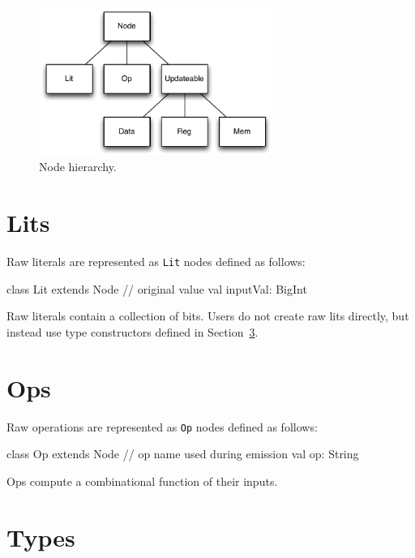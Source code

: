\documentclass[10pt,twocolumn]{article}
\def\code#1{{\small\tt #1}}
\begin{document}
\begin{figure}[h]
\centering
\includegraphics[width=3in]{figs/node-hierarchy.pdf}
\caption{Node hierarchy.}
\label{fig:node-hierarchy}
\end{figure}

\section{Lits}

Raw literals are represented as \code{Lit} nodes defined as follows:

\begin{scala}
class Lit extends Node {
  // original value
  val inputVal: BigInt
}
\end{scala}

\noindent
Raw literals contain a collection of bits.  
Users do not create raw lits directly, but instead use type
constructors defined in Section~\ref{sec:types}.



\section{Ops}

Raw operations are represented as \code{Op} nodes defined as follows:

\begin{scala}
class Op extends Node {
  // op name used during emission
  val op: String
}
\end{scala}

\noindent
Ops compute a combinational function of their inputs.

\section{Types}
\label{sec:types}
\end{document}
